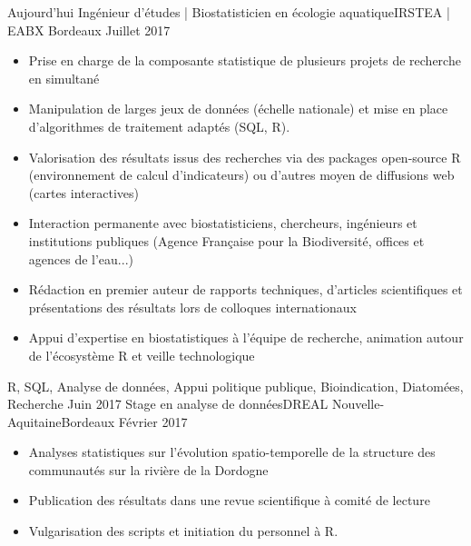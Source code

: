 \documentclass[localFont,alternative]{yaac-another-awesome-cv}
\begin{document}
\begin{experiences}
  \experience
    {Aujourd'hui}   {Ingénieur d'études | Biostatisticien en écologie aquatique}{IRSTEA | EABX }{Bordeaux}
    {Juillet 2017} {
                      \begin{itemize}                    
                        \item Prise en charge de la composante statistique de plusieurs projets de recherche en simultané
                        \item Manipulation de larges jeux de données (échelle nationale) et mise en place d'algorithmes de traitement adaptés (SQL, R).
                        \item Valorisation des résultats issus des recherches via des packages open-source R (environnement de calcul d'indicateurs) ou d'autres moyen de diffusions web (cartes interactives)
                        \item Interaction permanente avec biostatisticiens, chercheurs, ingénieurs et institutions publiques (Agence Française pour la Biodiversité, offices et agences de l'eau...)
                        \item Rédaction en premier auteur de rapports techniques, d'articles scientifiques et présentations des résultats lors de colloques internationaux
                        \item Appui d'expertise en biostatistiques à l'équipe de recherche, animation autour de l'écosystème R et veille technologique                                                                         
                      \end{itemize}
                    }
                    {R, SQL, Analyse de données, Appui politique publique, Bioindication, Diatomées, Recherche}
  \emptySeparator
  \experience
    {Juin 2017} {Stage en analyse de données}{DREAL Nouvelle-Aquitaine}{Bordeaux}
    {Février 2017}    {
                      \begin{itemize}                 
                        \item Analyses statistiques sur l’évolution spatio-temporelle de la structure des communautés sur la rivière de la Dordogne
                        \item Publication des résultats dans une revue scientifique à comité de lecture    
                        \item Vulgarisation des scripts et initiation du personnel à R.  
                                                

\end{itemize}}
\end{experiences}
\end{document}

